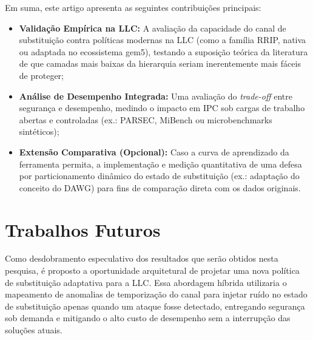 \documentclass[12pt]{article}
\begin{document}
Em suma, este artigo apresenta as seguintes contribuições principais:
\begin{itemize}
    \item \textbf{Validação Empírica na LLC:} A avaliação da capacidade do canal de substituição contra políticas modernas na LLC (como a família RRIP, nativa ou adaptada no ecossistema gem5), testando a suposição teórica da literatura de que camadas mais baixas da hierarquia seriam inerentemente mais fáceis de proteger;
    \item \textbf{Análise de Desempenho Integrada:} Uma avaliação do \textit{trade-off} entre segurança e desempenho, medindo o impacto em IPC sob cargas de trabalho abertas e controladas (ex.: PARSEC, MiBench ou microbenchmarks sintéticos);
    \item \textbf{Extensão Comparativa (Opcional):} Caso a curva de aprendizado da ferramenta permita, a implementação e medição quantitativa de uma defesa por particionamento dinâmico do estado de substituição (ex.: adaptação do conceito do DAWG) para fins de comparação direta com os dados originais.
\end{itemize}

\section{Trabalhos Futuros}
Como desdobramento especulativo dos resultados que serão obtidos nesta pesquisa, é proposto a oportunidade arquitetural de projetar uma nova política de substituição adaptativa para a LLC. Essa abordagem híbrida utilizaria o mapeamento de anomalias de temporização do canal para injetar ruído no estado de substituição apenas quando um ataque fosse detectado, entregando segurança sob demanda e mitigando o alto custo de desempenho sem a interrupção das soluções atuais.

\newpage


\end{document}
